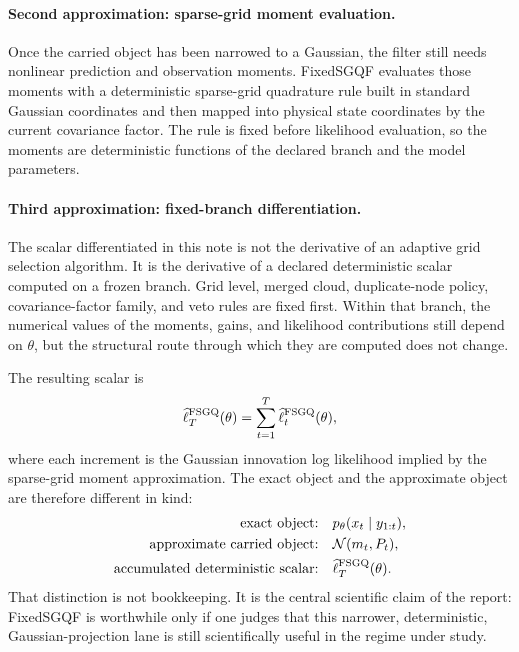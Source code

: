 \documentclass[11pt]{article}
\numberwithin{equation}{section}
\newcommand{\N}{\mathcal N}
\newcommand{\ellhat}{\widehat\ell}
\begin{document}
\paragraph{Second approximation: sparse-grid moment evaluation.}
Once the carried object has been narrowed to a Gaussian, the filter still needs
nonlinear prediction and observation moments.  FixedSGQF evaluates those moments
with a deterministic sparse-grid quadrature rule built in standard Gaussian
coordinates and then mapped into physical state coordinates by the current
covariance factor.  The rule is fixed before likelihood evaluation, so the
moments are deterministic functions of the declared branch and the model
parameters.

\paragraph{Third approximation: fixed-branch differentiation.}
The scalar differentiated in this note is not the derivative of an adaptive grid
selection algorithm.  It is the derivative of a declared deterministic scalar
computed on a frozen branch.  Grid level, merged cloud, duplicate-node policy,
covariance-factor family, and veto rules are fixed first.  Within that branch,
the numerical values of the moments, gains, and likelihood contributions still
depend on \(\theta\), but the structural route through which they are computed
does not change.

The resulting scalar is
\begin{equation}
  \ellhat_T^{\rm FSGQ}(\theta)
  =
  \sum_{t=1}^T \ellhat_t^{\rm FSGQ}(\theta),
  \label{eq:p32-one-page-scalar}
\end{equation}
where each increment is the Gaussian innovation log likelihood implied by the
sparse-grid moment approximation.  The exact object and the approximate object
are therefore different in kind:
\begin{equation}
\begin{aligned}
  \text{exact object:}
  &\quad p_\theta(x_t\mid y_{1:t}), \\
  \text{approximate carried object:}
  &\quad \N(m_t,P_t), \\
  \text{accumulated deterministic scalar:}
  &\quad \ellhat_T^{\rm FSGQ}(\theta).
\end{aligned}
  \label{eq:p32-exact-vs-approximate-summary}
\end{equation}
That distinction is not bookkeeping.  It is the central scientific claim of the
report: FixedSGQF is worthwhile only if one judges that this narrower,
deterministic, Gaussian-projection lane is still scientifically useful in the
regime under study.
\end{document}
